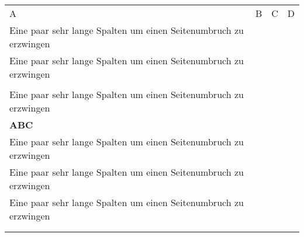     \begin{longtable}{XXXX}
        \small \singlespacing
        \\ \hline \rowcolor{lightgray}
        A & B & C & D \\ \hline \endhead
        Eine paar sehr lange Spalten um einen Seitenumbruch zu erzwingen & & & \\ \hline
        Eine paar sehr lange Spalten um einen Seitenumbruch zu erzwingen & & & \\ \hline
        & & & \\ \hline
        Eine paar sehr lange Spalten um einen Seitenumbruch zu erzwingen & & & \\ \hline
        \rowcolor{light-green} \textbf{ABC} & & & \\ \hline
        Eine paar sehr lange Spalten um einen Seitenumbruch zu erzwingen & & & \\ \hline
        Eine paar sehr lange Spalten um einen Seitenumbruch zu erzwingen & & & \\ \hline
        Eine paar sehr lange Spalten um einen Seitenumbruch zu erzwingen & & & \\ \hline
        & & & \\ \hline
        & & & \\ \hline
    \end{longtable}
